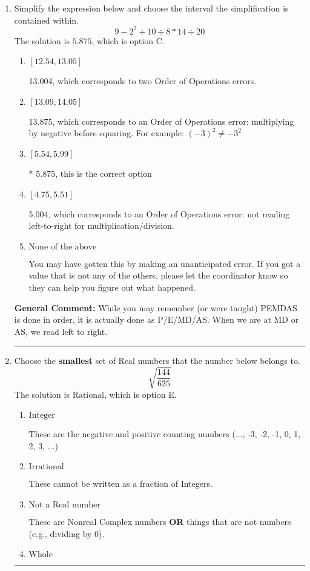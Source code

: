 \documentclass{extbook}[14pt]
\newcommand{\litem}[1]{\item #1

\rule{\textwidth}{0.4pt}}
\begin{document}
\begin{enumerate}
{ Irrational numbers are more than just square root of 3: adding or subtracting values from square root of 3 is also irrational.
}
\litem{
Simplify the expression below and choose the interval the simplification is contained within.
\[ 9 - 2^2 + 10 \div 8 * 14 \div 20 \]The solution is \( 5.875 \), which is option C.\begin{enumerate}[label=\Alph*.]
\item \( [12.54, 13.05] \)

 13.004, which corresponds to two Order of Operations errors.
\item \( [13.09, 14.05] \)

 13.875, which corresponds to an Order of Operations error: multiplying by negative before squaring. For example: $(-3)^2 \neq -3^2$
\item \( [5.54, 5.99] \)

* 5.875, this is the correct option
\item \( [4.75, 5.51] \)

 5.004, which corresponds to an Order of Operations error: not reading left-to-right for multiplication/division.
\item \( \text{None of the above} \)

 You may have gotten this by making an unanticipated error. If you got a value that is not any of the others, please let the coordinator know so they can help you figure out what happened.
\end{enumerate}

\textbf{General Comment:} While you may remember (or were taught) PEMDAS is done in order, it is actually done as P/E/MD/AS. When we are at MD or AS, we read left to right.
}
\litem{
Choose the \textbf{smallest} set of Real numbers that the number below belongs to.
\[ \sqrt{\frac{144}{625}} \]The solution is \( \text{Rational} \), which is option E.\begin{enumerate}[label=\Alph*.]
\item \( \text{Integer} \)

These are the negative and positive counting numbers (..., -3, -2, -1, 0, 1, 2, 3, ...)
\item \( \text{Irrational} \)

These cannot be written as a fraction of Integers.
\item \( \text{Not a Real number} \)

These are Nonreal Complex numbers \textbf{OR} things that are not numbers (e.g., dividing by 0).
\item \( \text{Whole} \)


\end{enumerate}}
\end{enumerate}
\end{document}
